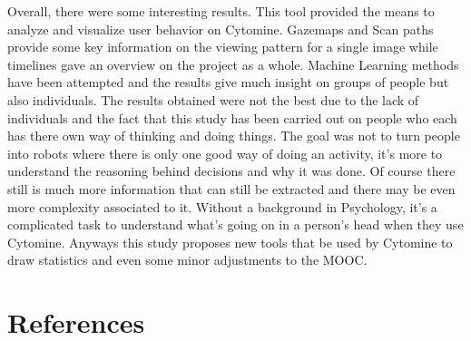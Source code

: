 \documentclass[a4paper,11pt]{report}
\numberwithin{figure}{section} %
\begin{document}
    Overall, there were some interesting results.
    This tool provided the means to analyze and visualize user behavior on Cytomine.
    Gazemaps and Scan paths provide some key information on the viewing pattern for a single image while timelines gave an overview on the project as a whole.
    Machine Learning methods have been attempted and the results give much insight on groups of people but also individuals.
    The results obtained were not the best due to the lack of individuals and the fact that this study has been carried out on people who each has there own way of thinking and doing things.
    The goal was not to turn people into robots where there is only one good way of doing an activity, it's more to understand the reasoning behind decisions and why it was done.
    Of course there still is much more information that can still be extracted and there may be even more complexity associated to it.
    Without a background in Psychology, it's a complicated task to understand what's going on in a person's head when they use Cytomine.
    Anyways this study proposes new tools that be used by Cytomine to draw statistics and even some minor adjustments to the MOOC.


\section{References}
\end{document}
